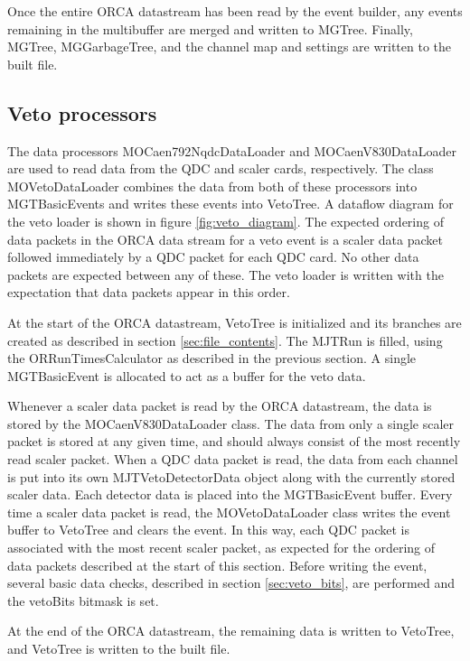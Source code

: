 \documentclass[/main.tex]{subfiles}
\begin{document}
\par
Once the entire ORCA datastream has been read by the event builder, any events remaining in the multibuffer are merged and written to MGTree.
Finally, MGTree, MGGarbageTree, and the channel map and settings are written to the built file.

\subsection{Veto processors} \label{sec:veto_description}
The data processors MOCaen792NqdcDataLoader and MOCaenV830DataLoader are used to read data from the QDC and scaler cards, respectively.
The class MOVetoDataLoader combines the data from both of these processors into MGTBasicEvents and writes these events into VetoTree.
A dataflow diagram for the veto loader is shown in figure \ref{fig:veto_diagram}.
The expected ordering of data packets in the ORCA data stream for a veto event is a scaler data packet followed immediately by a QDC packet for each QDC card.
No other data packets are expected between any of these.
The veto loader is written with the expectation that data packets appear in this order.
\par
At the start of the ORCA datastream, VetoTree is initialized and its branches are created as described in section \ref{sec:file_contents}.
The MJTRun is filled, using the ORRunTimesCalculator as described in the previous section.
A single MGTBasicEvent is allocated to act as a buffer for the veto data.
\par
Whenever a scaler data packet is read by the ORCA datastream, the data is stored by the MOCaenV830DataLoader class.
The data from only a single scaler packet is stored at any given time, and should always consist of the most recently read scaler packet.
When a QDC data packet is read, the data from each channel is put into its own MJTVetoDetectorData object along with the currently stored scaler data.
Each detector data is placed into the MGTBasicEvent buffer.
Every time a scaler data packet is read, the MOVetoDataLoader class writes the event buffer to VetoTree and clears the event.
In this way, each QDC packet is associated with the most recent scaler packet, as expected for the ordering of data packets described at the start of this section.
Before writing the event, several basic data checks, described in section \ref{sec:veto_bits}, are performed and the vetoBits bitmask is set.
\par
At the end of the ORCA datastream, the remaining data is written to VetoTree, and VetoTree is written to the built file.
\end{document}
